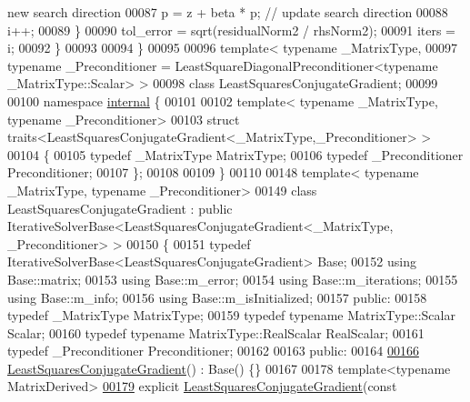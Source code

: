 \begin{DoxyCode}
{       new search direction}
00087     p = z + beta * p;                               \textcolor{comment}{// update search direction}
00088     i++;
00089   \}
00090   tol\_error = sqrt(residualNorm2 / rhsNorm2);
00091   iters = i;
00092 \}
00093 
00094 \}
00095 
00096 \textcolor{keyword}{template}< \textcolor{keyword}{typename} \_MatrixType,
00097           \textcolor{keyword}{typename} \_Preconditioner = LeastSquareDiagonalPreconditioner<typename \_MatrixType::Scalar> >
00098 \textcolor{keyword}{class }LeastSquaresConjugateGradient;
00099 
00100 \textcolor{keyword}{namespace }\hyperlink{namespaceinternal}{internal} \{
00101 
00102 \textcolor{keyword}{template}< \textcolor{keyword}{typename} \_MatrixType, \textcolor{keyword}{typename} \_Preconditioner>
00103 \textcolor{keyword}{struct }traits<LeastSquaresConjugateGradient<\_MatrixType,\_Preconditioner> >
00104 \{
00105   \textcolor{keyword}{typedef} \_MatrixType MatrixType;
00106   \textcolor{keyword}{typedef} \_Preconditioner Preconditioner;
00107 \};
00108 
00109 \}
00110 
00148 \textcolor{keyword}{template}< \textcolor{keyword}{typename} \_MatrixType, \textcolor{keyword}{typename} \_Preconditioner>
00149 \textcolor{keyword}{class }LeastSquaresConjugateGradient : \textcolor{keyword}{public} IterativeSolverBase<LeastSquaresConjugateGradient<\_MatrixType,
      \_Preconditioner> >
00150 \{
00151   \textcolor{keyword}{typedef} IterativeSolverBase<LeastSquaresConjugateGradient> Base;
00152   \textcolor{keyword}{using} Base::matrix;
00153   \textcolor{keyword}{using} Base::m\_error;
00154   \textcolor{keyword}{using} Base::m\_iterations;
00155   \textcolor{keyword}{using} Base::m\_info;
00156   \textcolor{keyword}{using} Base::m\_isInitialized;
00157 \textcolor{keyword}{public}:
00158   \textcolor{keyword}{typedef} \_MatrixType MatrixType;
00159   \textcolor{keyword}{typedef} \textcolor{keyword}{typename} MatrixType::Scalar Scalar;
00160   \textcolor{keyword}{typedef} \textcolor{keyword}{typename} MatrixType::RealScalar RealScalar;
00161   \textcolor{keyword}{typedef} \_Preconditioner Preconditioner;
00162 
00163 \textcolor{keyword}{public}:
00164 
\hyperlink{group___iterative_linear_solvers___module_ace69f423fcc1f8960d0e2de0667447c9}{00166}   \hyperlink{group___iterative_linear_solvers___module_ace69f423fcc1f8960d0e2de0667447c9}{LeastSquaresConjugateGradient}() : Base() \{\}
00167 
00178   \textcolor{keyword}{template}<\textcolor{keyword}{typename} MatrixDerived>
\hyperlink{group___iterative_linear_solvers___module_a91c4f2edc20f93cee9b721165937fb99}{00179}   \textcolor{keyword}{explicit} \hyperlink{group___iterative_linear_solvers___module_a91c4f2edc20f93cee9b721165937fb99}{LeastSquaresConjugateGradient}(\textcolor{keyword}{const} 

\end{DoxyCode}
